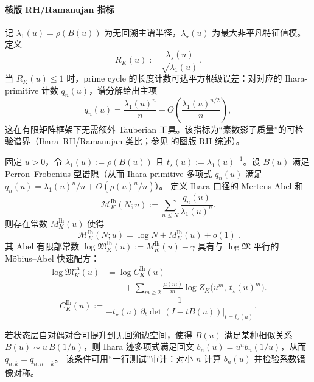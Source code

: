 \paragraph{核版 RH/Ramanujan 指标}
记 $\lambda_1(u)=\rho(B(u))$ 为无回溯主谱半径，$\lambda_\star(u)$ 为最大非平凡特征值模。定义
\[
R_K(u):=\frac{\lambda_\star(u)}{\sqrt{\lambda_1(u)}}.
\]
当 $R_K(u)\le 1$ 时，prime cycle 的长度计数可达平方根级误差：对对应的 Ihara-primitive 计数 $q_n(u)$，谱分解给出主项
\[
q_n(u)=\frac{\lambda_1(u)^n}{n}+O\!\left(\frac{\lambda_1(u)^{n/2}}{n}\right),
\]
这在有限矩阵框架下无需额外 Tauberian 工具。该指标为“素数影子质量”的可检验谱界（Ihara--RH/Ramanujan 类比；参见 \cite{TerrasZetaGraphs,StarkTerras1996GraphCoverings} 的图版 RH 综述）。

\begin{proposition}\label{prop:ihara-mertens-constant}
固定 \(u>0\)，令 \(\lambda_1(u):=\rho(B(u))\) 且 \(t_\star(u):=\lambda_1(u)^{-1}\)。设 \(B(u)\) 满足 Perron--Frobenius 型谱隙（从而 Ihara-primitive 多项式 \(q_n(u)\) 满足 \(q_n(u)=\lambda_1(u)^n/n+O(\rho(u)^n/n)\)）。
定义 Ihara 口径的 Mertens Abel 和
\[
\mathcal{M}^{\mathrm{Ih}}_K(N;u):=\sum_{n\le N}\frac{q_n(u)}{\lambda_1(u)^n}.
\]
则存在常数 \(M^{\mathrm{Ih}}_K(u)\) 使得
\[
\boxed{\ \mathcal{M}^{\mathrm{Ih}}_K(N;u)=\log N+M^{\mathrm{Ih}}_K(u)+o(1)\ }.
\]
其 Abel 有限部常数 \(\log\mathfrak{M}^{\mathrm{Ih}}_K(u):=M^{\mathrm{Ih}}_K(u)-\gamma\) 具有与 \(\log\mathfrak{M}\) 平行的 Möbius--Abel 快速配方：
\[
\boxed{
\begin{aligned}
\log\mathfrak{M}^{\mathrm{Ih}}_K(u)
&=\log C^{\mathrm{Ih}}_K(u)\\
&\qquad +\sum_{m\ge 2}\frac{\mu(m)}{m}\log Z_K\!\bigl(u^m,\,t_\star(u)^m\bigr).
\end{aligned}
}
\]
\[
C^{\mathrm{Ih}}_K(u):=\frac{1}{-t_\star(u)\,\partial_t\det(I-tB(u))\big|_{t=t_\star(u)}}.
\]
\end{proposition}

\begin{conjecture}\label{conj:ihara-duality-lift}
若状态层自对偶对合可提升到无回溯边空间，使得 \(B(u)\) 满足某种相似关系 \(B(u)\sim u\,B(1/u)\)，则 Ihara 迹多项式满足回文
\(
b_n(u)=u^n b_n(1/u)
\)，从而 \(q_{n,k}=q_{n,n-k}\)。
该条件可用“一行测试”审计：对小 \(n\) 计算 \(b_n(u)\) 并检验系数镜像对称。
\end{conjecture}

